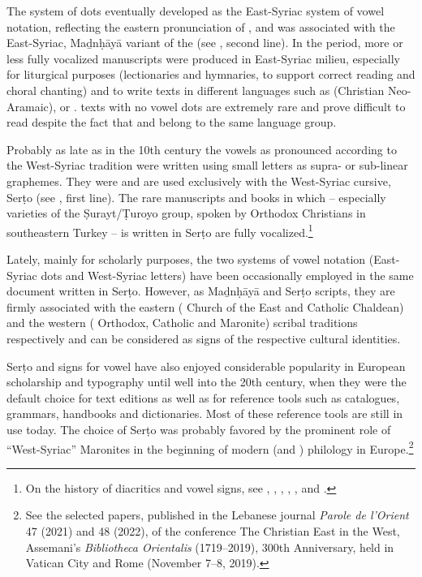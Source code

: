 \documentclass[output=paper,colorlinks,citecolor=brown,arabfont,syriacfont]{langscibook}
\begin{document}
The system of  dots eventually developed as the East-Syriac system of vowel notation, reflecting the eastern pronunciation of , and was associated with the East-Syriac, Maḏnḥāyā variant of the   (see , second line). In the  period, more or less fully vocalized manuscripts were produced in East-Syriac milieu, especially for liturgical purposes (lectionaries and hymnaries, to support correct reading and choral chanting) and to write texts in different languages such as  (Christian Neo-Aramaic),  or  .  texts with no vowel dots are extremely rare and prove difficult to read despite the fact that  and  belong to the same  language group.

Probably as late as in the 10th century the  vowels as pronounced according to the West-Syriac tradition were written using small  letters as supra- or sub-linear graphemes. They were and are used exclusively with the West-Syriac cursive, Serṭo  (see , first line). The rare manuscripts and books in which  -- especially varieties of the Ṣurayt/Ṭuroyo group, spoken by  Orthodox Christians in southeastern Turkey -- is written in Serṭo are fully vocalized.\footnote{%
On the history of  diacritics and vowel signs, see \citet{morag1961}, \citet{jones1998}, \citet{coakley2011}, \citet[12, 59--90]{kiraz2012}, \citet{kiraz2019}, and \citet{posegay2021}.}

Lately, mainly for scholarly purposes, the two systems of vowel notation (East-Syriac dots and West-Syriac  letters) have been occasionally employed in the same document written in Serṭo. However, as Maḏnḥāyā and Serṭo scripts, they are firmly associated with the eastern ( Church of the East and Catholic Chaldean) and the western ( Orthodox,  Catholic and Maronite) scribal traditions respectively and can be considered as signs of the respective cultural identities.

\largerpage
Serṭo and  signs for vowel have also enjoyed considerable popularity in European scholarship and typography until well into the 20th century, when they were the default choice for text editions as well as for reference tools such as catalogues, grammars, handbooks and dictionaries. Most of these reference tools are still in use today. The choice of Serṭo was probably favored by the prominent role of ``West-Syriac'' Maronites in the beginning of modern  (and ) philology in Europe.\footnote{%
See the selected papers, published in the Lebanese journal \textit{Parole de l'Orient} 47 (2021) and 48 (2022), of the conference The Christian East in the  West, Assemani's \textit{Bibliotheca Orientalis} (1719--2019), 300th Anniversary, held in Vatican City and Rome (November 7--8, 2019).}
\clearpage
\end{document}
